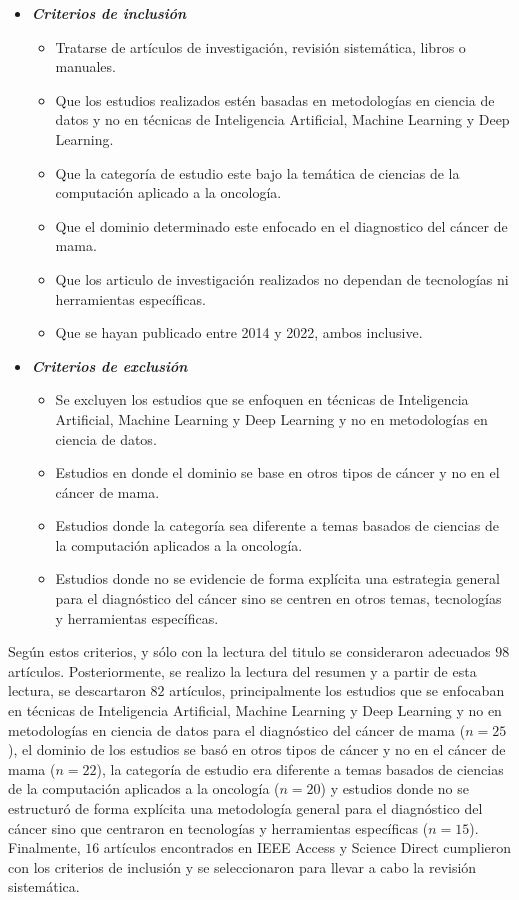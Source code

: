 \begin{itemize}
	
	\item{\textbf{\textit{Criterios de inclusión}}}
	\begin{itemize}
		\item Tratarse de artículos de investigación, revisión sistemática, libros o manuales. 
		\item Que los estudios realizados estén basadas en metodologías en ciencia de datos  y no en técnicas de Inteligencia Artificial, Machine Learning y Deep Learning.
		\item Que la categoría de estudio este bajo la temática de ciencias de la computación aplicado a la oncología.
		\item Que el dominio determinado este enfocado en el diagnostico del cáncer de mama.
		\item Que los articulo de investigación realizados no dependan de tecnologías ni herramientas específicas.
		\item Que se hayan publicado entre 2014 y 2022, ambos inclusive.
		
	\end{itemize}
	
	\item{\textbf{\textit{Criterios de exclusión}}}
	\begin{itemize}
		\item Se excluyen los estudios que se enfoquen en técnicas de Inteligencia Artificial, Machine Learning y Deep Learning y no en metodologías en ciencia de datos. 
		\item Estudios en donde el dominio se base en otros tipos de cáncer y no en el cáncer de mama.
		\item Estudios donde la categoría sea diferente a temas basados de ciencias de la computación aplicados a la oncología. 
		\item Estudios donde no se evidencie de forma explícita una estrategia general para el diagnóstico del cáncer sino se centren en otros temas, tecnologías y herramientas específicas.
	\end{itemize}
	
\end{itemize}

Según estos criterios, y sólo con la lectura del titulo se consideraron adecuados $98$ artículos. Posteriormente, se realizo la lectura del resumen y a partir de esta lectura, se descartaron $82$ artículos, principalmente los estudios que se enfocaban en técnicas de Inteligencia Artificial, Machine Learning y Deep Learning y no en metodologías en ciencia de datos para el diagnóstico del cáncer de mama ($n=25$), el dominio de los estudios se basó en otros tipos de cáncer y no en el cáncer de mama ($n=22$), la categoría de estudio era diferente a temas basados de ciencias de la computación aplicados a la oncología ($n=20$) y estudios donde no se estructuró de forma explícita una metodología general para el diagnóstico del cáncer sino que centraron en tecnologías y herramientas específicas ($n=15$). Finalmente, $16$ artículos encontrados en IEEE Access y Science Direct cumplieron con los criterios de inclusión y se seleccionaron para llevar a cabo la revisión sistemática. 

